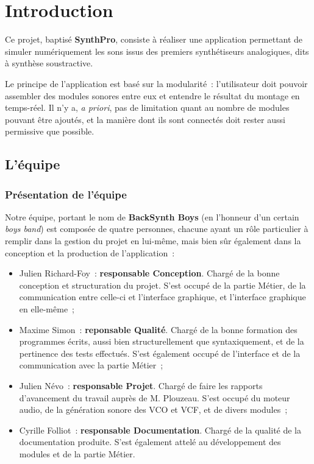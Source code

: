 \section{Introduction}

Ce projet, baptisé \textbf{SynthPro}, consiste à réaliser une
application permettant de simuler numériquement les sons issus des
premiers synthétiseurs analogiques, dits à synthèse soustractive.

Le principe de l'application est basé sur la modularité~:
l'utilisateur doit pouvoir assembler des modules sonores entre eux
et entendre le résultat du montage en temps-réel. Il n'y a,
\emph{a priori}, pas de limitation quant au nombre de modules
pouvant être ajoutés, et la manière dont ils sont connectés doit
rester aussi permissive que possible.

\subsection{L'équipe}

\subsubsection{Présentation de l'équipe}

Notre équipe, portant le nom de \textbf{BackSynth Boys} (en
l'honneur d'un certain \emph{boys band}) est composée de quatre
personnes, chacune ayant un rôle particulier à remplir dans la
gestion du projet en lui-même, mais bien sûr également dans la
conception et la production de l'application~:

\begin{itemize}
\item
  Julien Richard-Foy~: \textbf{responsable Conception}. Chargé de la
  bonne conception et structuration du projet. S'est occupé de la
  partie Métier, de la communication entre celle-ci et l'interface
  graphique, et l'interface graphique en elle-même~;
\item
  Maxime Simon~: \textbf{reponsable Qualité}. Chargé de la bonne
  formation des programmes écrits, aussi bien structurellement que
  syntaxiquement, et de la pertinence des tests effectués. S'est
  également occupé de l'interface et de la communication avec la
  partie Métier~;
\item
  Julien Névo~: \textbf{responsable Projet}. Chargé de faire les
  rapports d'avancement du travail auprès de M. Plouzeau. S'est
  occupé du moteur audio, de la génération sonore des VCO et VCF, et
  de divers modules~;
\item
  Cyrille Folliot~: \textbf{responsable Documentation}. Chargé de la
  qualité de la documentation produite. S'est également attelé au
  développement des modules et de la partie Métier.
\end{itemize}
